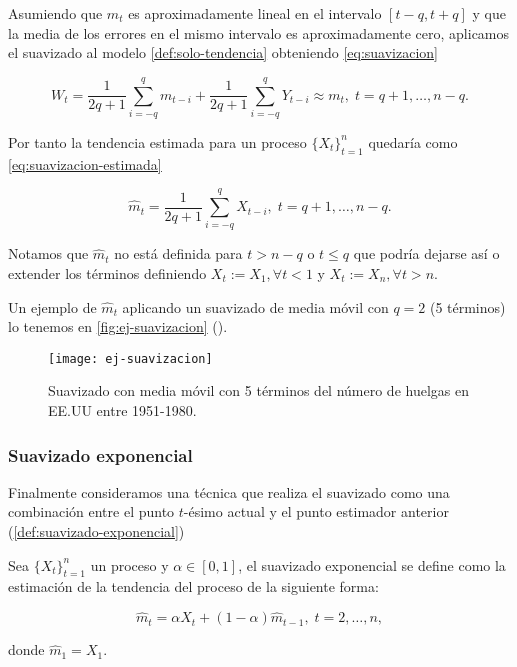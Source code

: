 Asumiendo que $m_t$ es aproximadamente lineal en el intervalo $[t - q, t + q]$ y que la media de los errores en el mismo intervalo es aproximadamente cero, aplicamos el suavizado al modelo \autoref{def:solo-tendencia} obteniendo \eqref{eq:suavizacion}

\begin{equation}
  W_t = \dfrac{1}{2q + 1} \sum \limits^q_{i = -q} m_{t - i} + \dfrac{1}{2q + 1} \sum \limits^q_{i = -q} Y_{t - i} \approx m_t, \; t = q + 1, \ldots, n - q.
  \label{eq:suavizacion}
\end{equation}

Por tanto la tendencia estimada para un proceso $\{X_t\}_{t = 1}^n$ quedaría como \eqref{eq:suavizacion-estimada}

\begin{equation}
  \hat{m}_t = \dfrac{1}{2q + 1} \sum \limits^q_{i = -q} X_{t - i}, \; t = q + 1, \ldots, n - q.
  \label{eq:suavizacion-estimada}
\end{equation}

Notamos que $\hat{m}_t$ no está definida para $t > n - q$ o $t \leq q$ que podría dejarse así o extender los términos definiendo $X_t := X_1, \forall t < 1$ y $X_t := X_n, \forall t > n$.

Un ejemplo de $\hat{m}_t$ aplicando un suavizado de media móvil con $q = 2$ (5 términos) lo tenemos en \autoref{fig:ej-suavizacion} (\cite{brockwell2002introduction}).

\begin{figure}[htpb]
  \centering
  \texttt{[image: ej-suavizacion]}
  \caption{Suavizado con media móvil con 5 términos del número de huelgas en EE.UU entre 1951-1980.}
  \label{fig:ej-suavizacion}
\end{figure}

\subsubsection{Suavizado exponencial}

Finalmente consideramos una técnica que realiza el suavizado como una combinación entre el punto $t$-ésimo actual y el punto estimador anterior (\autoref{def:suavizado-exponencial})

\begin{definicion}
  Sea $\{X_t\}_{t = 1}^n$ un proceso y $\alpha \in [0, 1]$, el suavizado exponencial se define como la estimación de la tendencia del proceso de la siguiente forma:

  $$\hat{m}_t = \alpha X_t + (1 - \alpha)\hat{m}_{t - 1}, \; t = 2, \ldots, n,$$

  donde $\hat{m}_1 = X_1$.
  \label{def:suavizado-exponencial}
\end{definicion}

